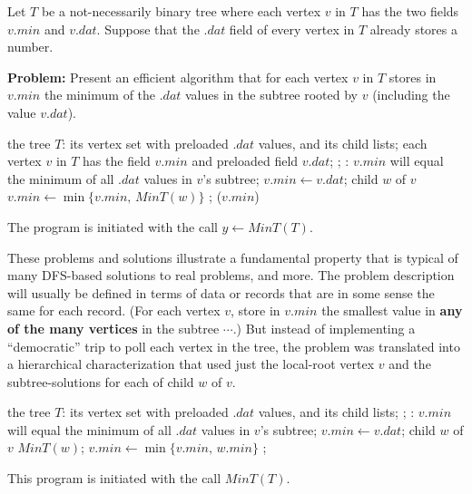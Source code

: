 
Let $T$ be a not-necessarily binary tree where each vertex $v$ in $T$ has the two fields $v.min$ and $v.dat$. 
Suppose that the $.dat$ field of every vertex in $T$ already stores a number.

\noindent
{\bf Problem:} Present an efficient algorithm that for each vertex $v$ in $T$ stores in $v.min$ the minimum of the $.dat$ values in
the subtree rooted by $v$ (including the value $v.dat$).

\noindent
\Prog\qq     %
\Global the tree $T$: its vertex set with preloaded $.dat$ values, and its child lists;\qq
\phantom{\Global }each vertex $v$ in $T$ has the field $v.min$ and preloaded field $v.dat$;\qq
{};\qq     %
\OUTPUT: $v.min$ will equal the minimum of all $.dat$ values in $v$'s subtree;\qq
$v.min\leftarrow v.dat$;\qq
\Foreach child ${w}$ of $v$ \Do\qq
$v.min\leftarrow \min\{v.min,\,MinT(w)\}$\qq
\Endfor;\qq
\Return($v.min$)\qq
\Fini %

The program is initiated with the call $y\leftarrow MinT(T)$.


These problems and solutions illustrate a fundamental property that is typical of many DFS-based solutions to real problems, and more. The
problem description will usually be defined in terms 
of data or records that are in some sense the same for each record.
(For each vertex $v$, store in $v.min$ the smallest value in {\bf any of the many vertices} in the subtree $\cdots$.)
But instead of implementing a ``democratic'' trip to poll each vertex in the tree, the problem was translated into a hierarchical characterization
that used just the local-root vertex $v$ and the subtree-solutions for each of child $w$ of $v$.

\noindent
\Prog\qq
\Global the tree $T$: its vertex set with preloaded $.dat$ values, and its child lists;\qq
{};\qq
\OUTPUT: $v.min$ will equal the minimum of all $.dat$ values in $v$'s subtree;\p
$v.min\leftarrow v.dat$;\p
\Foreach child ${w}$ of $v$ \Do\p
$MinT(w)$;\p
$v.min\leftarrow \min\{v.min,\,w.min\}$\p
\Endfor; \qq
\Fini

This program is initiated with the call $MinT(T)$.


